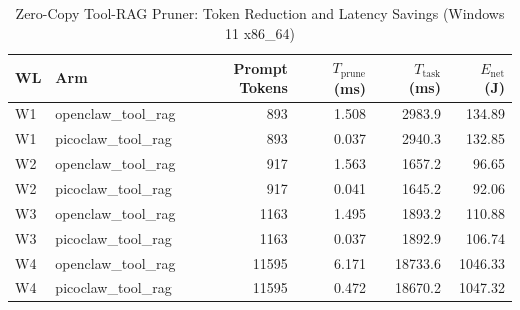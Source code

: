 \begin{table}[t]
\centering\small
\caption{Zero-Copy Tool-RAG Pruner: Token Reduction and Latency Savings (Windows 11 x86_64)}
\label{tab:Windows_tool_rag}
\begin{tabular}{llrrrr}
\toprule
WL & Arm & Prompt Tokens & $T_{\text{prune}}$ (ms) & $T_{\text{task}}$ (ms) & $E_{\text{net}}$ (J) \\
\midrule
W1 & openclaw\_tool\_rag & 893 & 1.508 & 2983.9 & 134.89 \\
W1 & picoclaw\_tool\_rag & 893 & 0.037 & 2940.3 & 132.85 \\
W2 & openclaw\_tool\_rag & 917 & 1.563 & 1657.2 & 96.65 \\
W2 & picoclaw\_tool\_rag & 917 & 0.041 & 1645.2 & 92.06 \\
W3 & openclaw\_tool\_rag & 1163 & 1.495 & 1893.2 & 110.88 \\
W3 & picoclaw\_tool\_rag & 1163 & 0.037 & 1892.9 & 106.74 \\
W4 & openclaw\_tool\_rag & 11595 & 6.171 & 18733.6 & 1046.33 \\
W4 & picoclaw\_tool\_rag & 11595 & 0.472 & 18670.2 & 1047.32 \\
\bottomrule
\end{tabular}
\end{table}
